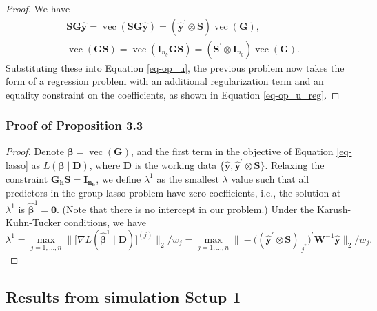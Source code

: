 \documentclass[
  11pt]{article}
\theoremstyle{plain}
\theoremstyle{remark}
\begin{document}
\begin{proof}
We have\vspace*{-0.4cm}\enlargethispage{0.4cm} \[
\begin{aligned}
& \bm{SG}\hat{\bm{y}} = \operatorname{vec}\left(\bm{SG}\hat{\bm{y}}\right) = \left(\hat{\bm{y}}^{\prime} \otimes \bm{S}\right) \operatorname{vec}(\bm{G}), \\
& \operatorname{vec}\left(\bm{G}\bm{S}\right) = \operatorname{vec}\left(\bm{I}_{n_b}\bm{G}\bm{S}\right) = \left(\bm{S}^{\prime} \otimes \bm{I}_{n_b}\right) \operatorname{vec}(\bm{G}).
\end{aligned}
\] Substituting these into Equation \eqref{eq-op_u}, the previous
problem now takes the form of a regression problem with an additional
regularization term and an equality constraint on the coefficients, as
shown in Equation \eqref{eq-op_u_reg}.
\end{proof}

\subsubsection{Proof of Proposition 3.3}\label{proof-of-proposition-3.3}

\begin{proof}
Denote \(\bm{\beta} = \operatorname{vec}(\bm{G})\), and the first term
in the objective of Equation \eqref{eq-lasso} as
\(L\left(\bm{\beta} \mid \bm{D}\right)\), where \(\bm{D}\) is the
working data
\(\{\hat{\bm{y}} , \hat{\bm{y}}^{\prime} \otimes \bm{S}\}\). Relaxing
the constraint \(\bm{G_h S}=\bm{I_{n_b}}\), we define \(\lambda^{1}\) as
the smallest \(\lambda\) value such that all predictors in the group
lasso problem have zero coefficients, i.e., the solution at
\(\lambda^{1}\) is \(\hat{\bm{\beta}}^{1}=\bm{0}\). (Note that there is
no intercept in our problem.) Under the Karush-Kuhn-Tucker conditions,
we have \[
\lambda^{1}
 = \max_{j=1, \ldots, n}\big\|\big[\nabla L(\hat{\bm{\beta}}^{1} \mid \bm{D})\big]^{(j)}\big\|_2 / w_j
 = \max_{j=1, \ldots, n}\big\|-\big((\hat{\bm{y}}^{\prime} \otimes \bm{S})_{\cdot j^{*}}\big)^{\prime} \bm{W}^{-1} \hat{\bm{y}}\big\|_2 / w_j.
\]
\end{proof}

\clearpage

\subsection{Results from simulation Setup 1}\label{appendix-sim1}
\end{document}
